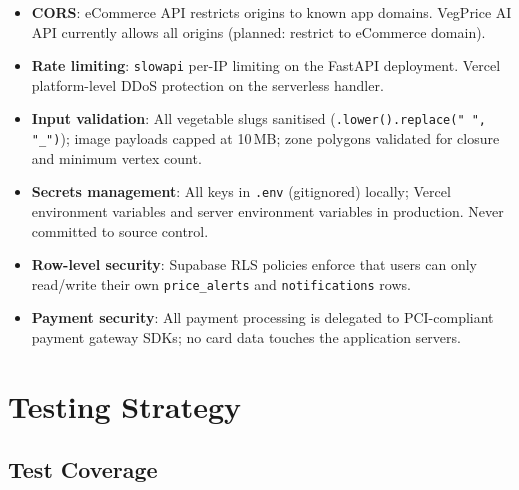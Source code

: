 \documentclass[12pt, a4paper, oneside]{report}
\begin{document}
\begin{itemize}
  \item \textbf{CORS}: eCommerce API restricts origins to known app domains.
        VegPrice AI API currently allows all origins (planned: restrict to
        eCommerce domain).
  \item \textbf{Rate limiting}: \texttt{slowapi} per-IP limiting on the
        FastAPI deployment. Vercel platform-level DDoS protection on the
        serverless handler.
  \item \textbf{Input validation}: All vegetable slugs sanitised
        (\texttt{.lower().replace(" ", "\_")}); image payloads capped at
        10\,MB; zone polygons validated for closure and minimum vertex count.
  \item \textbf{Secrets management}: All keys in \texttt{.env} (gitignored)
        locally; Vercel environment variables and server environment variables
        in production. Never committed to source control.
  \item \textbf{Row-level security}: Supabase RLS policies enforce that users
        can only read/write their own \texttt{price\_alerts} and
        \texttt{notifications} rows.
  \item \textbf{Payment security}: All payment processing is delegated to
        PCI-compliant payment gateway SDKs; no card data touches the
        application servers.
\end{itemize}

\chapter{Testing Strategy}

\section{Test Coverage}
\end{document}
